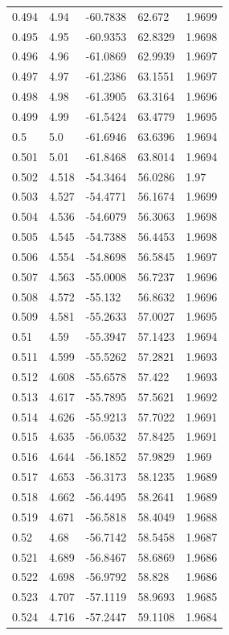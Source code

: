 \begin{tabular}{lllll}
0.494 & 4.94 & -60.7838 & 62.672 & 1.9699 \\
0.495 & 4.95 & -60.9353 & 62.8329 & 1.9698 \\
0.496 & 4.96 & -61.0869 & 62.9939 & 1.9697 \\
0.497 & 4.97 & -61.2386 & 63.1551 & 1.9697 \\
0.498 & 4.98 & -61.3905 & 63.3164 & 1.9696 \\
0.499 & 4.99 & -61.5424 & 63.4779 & 1.9695 \\
0.5 & 5.0 & -61.6946 & 63.6396 & 1.9694 \\
0.501 & 5.01 & -61.8468 & 63.8014 & 1.9694 \\
0.502 & 4.518 & -54.3464 & 56.0286 & 1.97 \\
0.503 & 4.527 & -54.4771 & 56.1674 & 1.9699 \\
0.504 & 4.536 & -54.6079 & 56.3063 & 1.9698 \\
0.505 & 4.545 & -54.7388 & 56.4453 & 1.9698 \\
0.506 & 4.554 & -54.8698 & 56.5845 & 1.9697 \\
0.507 & 4.563 & -55.0008 & 56.7237 & 1.9696 \\
0.508 & 4.572 & -55.132 & 56.8632 & 1.9696 \\
0.509 & 4.581 & -55.2633 & 57.0027 & 1.9695 \\
0.51 & 4.59 & -55.3947 & 57.1423 & 1.9694 \\
0.511 & 4.599 & -55.5262 & 57.2821 & 1.9693 \\
0.512 & 4.608 & -55.6578 & 57.422 & 1.9693 \\
0.513 & 4.617 & -55.7895 & 57.5621 & 1.9692 \\
0.514 & 4.626 & -55.9213 & 57.7022 & 1.9691 \\
0.515 & 4.635 & -56.0532 & 57.8425 & 1.9691 \\
0.516 & 4.644 & -56.1852 & 57.9829 & 1.969 \\
0.517 & 4.653 & -56.3173 & 58.1235 & 1.9689 \\
0.518 & 4.662 & -56.4495 & 58.2641 & 1.9689 \\
0.519 & 4.671 & -56.5818 & 58.4049 & 1.9688 \\
0.52 & 4.68 & -56.7142 & 58.5458 & 1.9687 \\
0.521 & 4.689 & -56.8467 & 58.6869 & 1.9686 \\
0.522 & 4.698 & -56.9792 & 58.828 & 1.9686 \\
0.523 & 4.707 & -57.1119 & 58.9693 & 1.9685 \\
0.524 & 4.716 & -57.2447 & 59.1108 & 1.9684 \\

\end{tabular}
